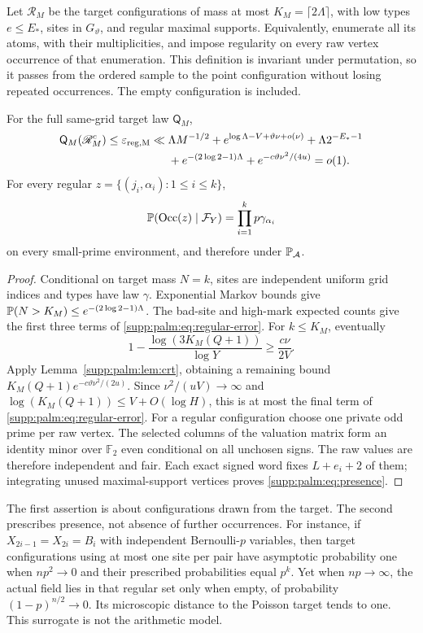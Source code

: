 Let $\mathscr R_M$ be the target configurations of mass at most $K_M=\lceil2\Lambda\rceil$, with low types $e\le E_*$, sites in $G_\vartheta$, and regular maximal supports. Equivalently, enumerate all its atoms,
with their multiplicities, and impose regularity on every raw vertex
occurrence of that enumeration. This definition is invariant under
permutation, so it passes from the ordered sample to the point
configuration without losing repeated occurrences. The empty
configuration is included.
\begin{theorem}\label{supp:palm:thm:regular}
For the full same-grid target law $\mathsf Q_M$,
\begin{align}\label{supp:palm:eq:regular-error}
 \mathsf Q_M(\mathscr R_M^c)\le\varepsilon_{\rm reg,M}
 \ll{}&\Lambda M^{-1/2}+e^{\log\Lambda-V+\vartheta\nu+o(\nu)}
           +\Lambda2^{-E_*-1}\notag\\
 &+e^{-(2\log2-1)\Lambda}+e^{-c\vartheta\nu^2/(4u)}=o(1).
\end{align}
For every regular $z=\{(j_i,\alpha_i):1\le i\le k\}$,
\begin{equation}\label{supp:palm:eq:presence}
 \mathbb P(\operatorname{Occ}(z)\mid\mathcal F_Y)
       =\prod_{i=1}^k p\gamma_{\alpha_i}
\end{equation}
on every small-prime environment, and therefore under $\mathbb P_{\mathcal A}$.
\end{theorem}
\begin{proof}
Conditional on target mass $N=k$, sites are independent uniform grid indices and types have law $\gamma$. Exponential Markov bounds give
$\mathbb P(N>K_M)\le e^{-(2\log2-1)\Lambda}$.
The bad-site and high-mark expected counts give the first three terms of
\eqref{supp:palm:eq:regular-error}.
For $k\le K_M$, eventually
\[
 1-\frac{\log(3K_M(Q+1))}{\log Y}\ge\frac{c\nu}{2V}.
\]
Apply Lemma~\ref{supp:palm:lem:crt}, obtaining a remaining bound
$K_M(Q+1)e^{-c\vartheta\nu^2/(2u)}$.
Since $\nu^2/(uV)\to\infty$ and $\log(K_M(Q+1))\le V+O(\log H)$, this is at most the final term of \eqref{supp:palm:eq:regular-error}.
For a regular configuration choose one private odd prime per raw vertex. The selected columns of the valuation matrix form an identity minor over $\mathbb F_2$ even conditional on all unchosen signs. The raw values are therefore independent and fair. Each exact signed word fixes $L+e_i+2$ of them; integrating unused maximal-support vertices proves \eqref{supp:palm:eq:presence}.
\end{proof}
The first assertion is about configurations drawn from the target. The second prescribes presence, not absence of further occurrences. For instance, if $X_{2i-1}=X_{2i}=B_i$ with independent Bernoulli-$p$ variables, then target configurations using at most one site per pair have asymptotic probability one when $np^2\to0$ and their prescribed probabilities equal $p^k$. Yet when $np\to\infty$, the actual field lies in that regular set only when empty, of probability $(1-p)^{n/2}\to0$. Its microscopic distance to the Poisson target tends to one. This surrogate is not the arithmetic model.

